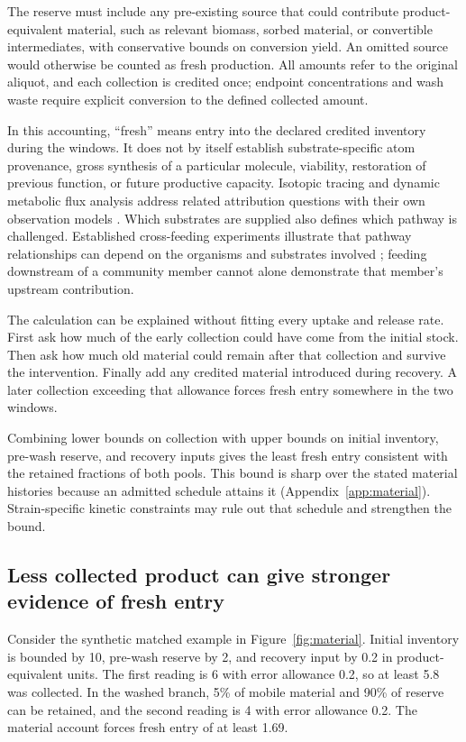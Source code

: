 \documentclass[11pt]{article}
\begin{document}
The reserve must include any pre-existing source that could contribute product-equivalent material, such as relevant biomass, sorbed material, or convertible intermediates, with conservative bounds on conversion yield. An omitted source would otherwise be counted as fresh production. All amounts refer to the original aliquot, and each collection is credited once; endpoint concentrations and wash waste require explicit conversion to the defined collected amount.

In this accounting, ``fresh'' means entry into the declared credited inventory during the windows. It does not by itself establish substrate-specific atom provenance, gross synthesis of a particular molecule, viability, restoration of previous function, or future productive capacity. Isotopic tracing and dynamic metabolic flux analysis address related attribution questions with their own observation models \citep{leighty}. Which substrates are supplied also defines which pathway is challenged. Established cross-feeding experiments illustrate that pathway relationships can depend on the organisms and substrates involved \citep{belenguer}; feeding downstream of a community member cannot alone demonstrate that member's upstream contribution.

The calculation can be explained without fitting every uptake and release rate. First ask how much of the early collection could have come from the initial stock. Then ask how much old material could remain after that collection and survive the intervention. Finally add any credited material introduced during recovery. A later collection exceeding that allowance forces fresh entry somewhere in the two windows.

Combining lower bounds on collection with upper bounds on initial inventory, pre-wash reserve, and recovery inputs gives the least fresh entry consistent with the retained fractions of both pools. This bound is sharp over the stated material histories because an admitted schedule attains it (Appendix~\ref{app:material}). Strain-specific kinetic constraints may rule out that schedule and strengthen the bound.

\subsection{Less collected product can give stronger evidence of fresh entry}
Consider the synthetic matched example in Figure~\ref{fig:material}. Initial inventory is bounded by 10, pre-wash reserve by 2, and recovery input by 0.2 in product-equivalent units. The first reading is 6 with error allowance 0.2, so at least 5.8 was collected. In the washed branch, 5\% of mobile material and 90\% of reserve can be retained, and the second reading is 4 with error allowance 0.2. The material account forces fresh entry of at least 1.69.
\end{document}
